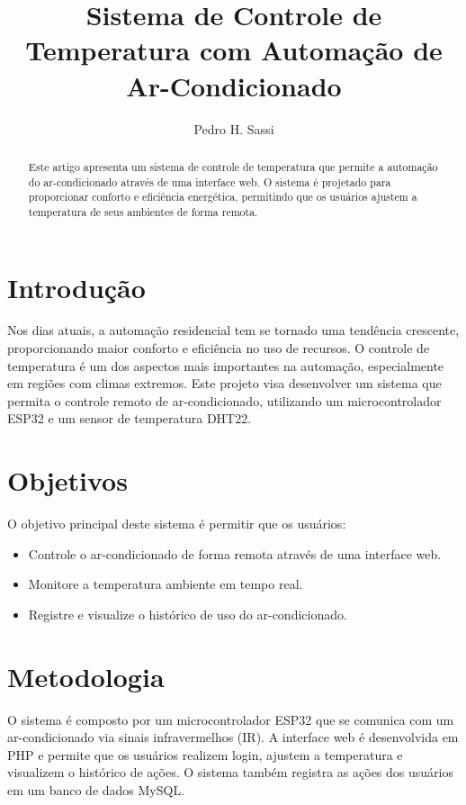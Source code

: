 \documentclass[article]{sbc}
\title{Sistema de Controle de Temperatura com Automação de Ar-Condicionado}
\author{Pedro H. Sassi}
\begin{document}
\maketitle

\begin{abstract}
Este artigo apresenta um sistema de controle de temperatura que permite a automação do ar-condicionado através de uma interface web. O sistema é projetado para proporcionar conforto e eficiência energética, permitindo que os usuários ajustem a temperatura de seus ambientes de forma remota.
\end{abstract}

\section{Introdução}
Nos dias atuais, a automação residencial tem se tornado uma tendência crescente, proporcionando maior conforto e eficiência no uso de recursos. O controle de temperatura é um dos aspectos mais importantes na automação, especialmente em regiões com climas extremos. Este projeto visa desenvolver um sistema que permita o controle remoto de ar-condicionado, utilizando um microcontrolador ESP32 e um sensor de temperatura DHT22.

\section{Objetivos}
O objetivo principal deste sistema é permitir que os usuários:
\begin{itemize}
    \item Controle o ar-condicionado de forma remota através de uma interface web.
    \item Monitore a temperatura ambiente em tempo real.
    \item Registre e visualize o histórico de uso do ar-condicionado.
\end{itemize}

\section{Metodologia}
O sistema é composto por um microcontrolador ESP32 que se comunica com um ar-condicionado via sinais infravermelhos (IR). A interface web é desenvolvida em PHP e permite que os usuários realizem login, ajustem a temperatura e visualizem o histórico de ações. O sistema também registra as ações dos usuários em um banco de dados MySQL.
\end{document}
